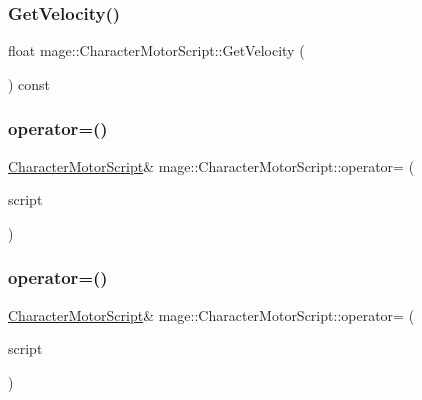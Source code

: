 \subsubsection{\texorpdfstring{Get\+Velocity()}{GetVelocity()}}
{\footnotesize\ttfamily float mage\+::\+Character\+Motor\+Script\+::\+Get\+Velocity (\begin{DoxyParamCaption}{ }\end{DoxyParamCaption}) const}

\hypertarget{classmage_1_1_character_motor_script_a5b66cbbe6b829fe56a1bba5f9093b36e}{}\label{classmage_1_1_character_motor_script_a5b66cbbe6b829fe56a1bba5f9093b36e} 
\subsubsection{\texorpdfstring{operator=()}{operator=()}\hspace{0.1cm}{\footnotesize\ttfamily [1/2]}}
{\footnotesize\ttfamily \hyperlink{classmage_1_1_character_motor_script}{Character\+Motor\+Script}\& mage\+::\+Character\+Motor\+Script\+::operator= (\begin{DoxyParamCaption}\item[{const \hyperlink{classmage_1_1_character_motor_script}{Character\+Motor\+Script} \&}]{script }\end{DoxyParamCaption})\hspace{0.3cm}{\ttfamily [delete]}}

\hypertarget{classmage_1_1_character_motor_script_a05e8822fa633d8642702d125b26069f7}{}\label{classmage_1_1_character_motor_script_a05e8822fa633d8642702d125b26069f7} 
\subsubsection{\texorpdfstring{operator=()}{operator=()}\hspace{0.1cm}{\footnotesize\ttfamily [2/2]}}
{\footnotesize\ttfamily \hyperlink{classmage_1_1_character_motor_script}{Character\+Motor\+Script}\& mage\+::\+Character\+Motor\+Script\+::operator= (\begin{DoxyParamCaption}\item[{\hyperlink{classmage_1_1_character_motor_script}{Character\+Motor\+Script} \&\&}]{script }\end{DoxyParamCaption})\hspace{0.3cm}{\ttfamily [delete]}}

